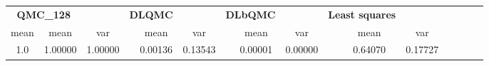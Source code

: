 \begin{tabular}{cccccccccccccccc}
\toprule
\multicolumn{2}{c}{\textbf{QMC\_128}}&&\multicolumn{2}{c}{\textbf{DLQMC}}&&\multicolumn{2}{c}{\textbf{DLbQMC}}&&\multicolumn{2}{c}{\textbf{Least squares}}\\ 
\cmidrule(r){2-3} \cmidrule(r){5-6} \cmidrule(r){8-9}
mean &mean&var&&mean&var&&mean&var&&mean&var\\ 
\midrule
1.0 &1.00000&1.00000&&0.00136&0.13543&&0.00001&0.00000&&0.64070&0.17727\\ 
\bottomrule
\end{tabular}

